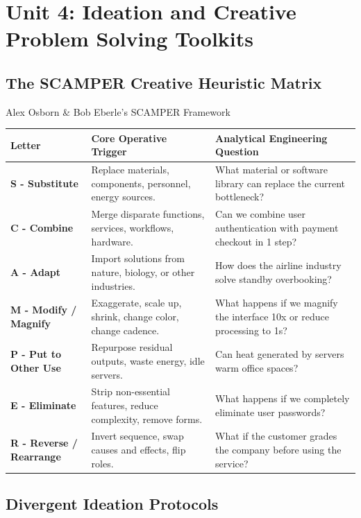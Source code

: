 \chapter{Unit 4: Ideation and Creative Problem Solving Toolkits}
\label{chap:unit4-ideation-selection}

\section{The SCAMPER Creative Heuristic Matrix}

\begin{canvasbox}{Alex Osborn \& Bob Eberle's SCAMPER Framework}
\begin{tabularx}{\linewidth}{|l|X|X|} \hline
\textbf{Letter} & \textbf{Core Operative Trigger} & \textbf{Analytical Engineering Question} \\ \hline
\textbf{S - Substitute} & Replace materials, components, personnel, energy sources. & What material or software library can replace the current bottleneck? \\ \hline
\textbf{C - Combine} & Merge disparate functions, services, workflows, hardware. & Can we combine user authentication with payment checkout in 1 step? \\ \hline
\textbf{A - Adapt} & Import solutions from nature, biology, or other industries. & How does the airline industry solve standby overbooking? \\ \hline
\textbf{M - Modify / Magnify} & Exaggerate, scale up, shrink, change color, change cadence. & What happens if we magnify the interface 10x or reduce processing to 1s? \\ \hline
\textbf{P - Put to Other Use} & Repurpose residual outputs, waste energy, idle servers. & Can heat generated by servers warm office spaces? \\ \hline
\textbf{E - Eliminate} & Strip non-essential features, reduce complexity, remove forms. & What happens if we completely eliminate user passwords? \\ \hline
\textbf{R - Reverse / Rearrange} & Invert sequence, swap causes and effects, flip roles. & What if the customer grades the company before using the service? \\ \hline
\end{tabularx}
\end{canvasbox}

\section{Divergent Ideation Protocols}

